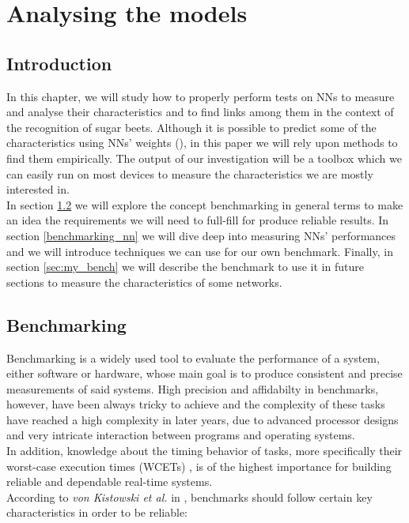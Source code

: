 \chapter{Analysing the models}\label{ana_models}
\section{Introduction}

In this chapter, we will study how to properly perform tests on NNs to measure and analyse their characteristics and to find links among them in the context of the recognition of sugar beets. Although it is possible to predict some of the characteristics using NNs' weights (\cite{Unterthiner2020PredictingNN}), in this paper we will rely upon methods to find them empirically. The output of our investigation will be a toolbox which we can easily run on most devices to measure the characteristics we are mostly interested in. \\
In section \ref{benchmarking} we will explore the concept benchmarking in general terms to make an idea  the requirements we will need to full-fill for produce reliable results. In section \ref{benchmarking_nn} we will dive deep into measuring NNs' performances and we will introduce techniques we can use for our own benchmark. Finally, in section \ref{sec:my_bench} we will describe the benchmark to use it in future sections to measure the characteristics of some networks. 

\section{Benchmarking}\label{benchmarking}
Benchmarking is a widely used tool to evaluate the performance of a system, either software or hardware, whose main goal is to produce consistent and precise measurements of said systems. High precision and affidabilty in benchmarks, however, have been always tricky to achieve and the complexity of these tasks have reached a high complexity in later years, due to advanced processor designs and very intricate interaction between programs and operating systems.\cite{DBLP:journals/corr/abs-1811-01412}\\
In addition, knowledge about the timing behavior of tasks, more specifically their worst-case execution times (WCETs) , is of the highest importance for building reliable and dependable real-time systems.\cite{Real-Time-Systems}\\
According to \textit{von Kistowski et al.} in \cite{how_to_bench}, benchmarks should follow certain key characteristics in order to be reliable:

